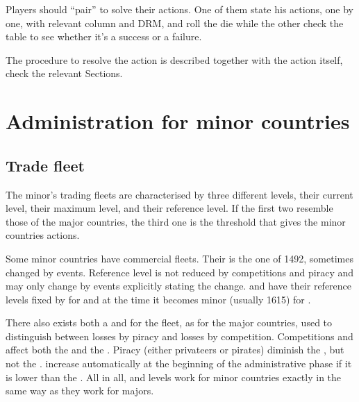 \begin{playtip}
  Players should ``pair'' to solve their actions. One of them state his
  actions, one by one, with relevant column and DRM, and roll the die while
  the other check the table to see whether it's a success or a failure.
\end{playtip}

\aparag The procedure to resolve the action is described together with the
action itself, check the relevant Sections.

\section{Administration for minor countries}

\label{chExpenses:Administration Minor}



\subsection{Trade fleet}\label{chExpenses:Minor Commercial Fleets}

\begin{note}
  The minor's trading fleets are characterised by three different levels,
  their current level, their maximum level, and their reference level. If the
  first two resemble those of the major countries, the third one is the
  threshold that gives the minor countries \TFI actions.
\end{note}

 Some minor countries have commercial
fleets. Their  is the one of 1492, sometimes changed by
events. Reference level is not reduced by competitions and piracy and may only
change by events explicitly stating the change.
\bparag[Exception] \paysPortugal and \paysVenise have their reference levels
fixed by  for \paysPortugal and at the time
it becomes minor (usually 1615) for \paysVenise.

\aparag There also exists both a  and  for the fleet, as for the major countries, used to distinguish
between losses by piracy and losses by competition.
\bparag Competitions and \TFI affect both the  and the
.
\bparag Piracy (either privateers or pirates) diminish the , but not the .
\bparag {} increase automatically at the beginning of the
administrative phase if it is lower than the .
\bparag All in all,  and  levels work for minor
countries exactly in the same way as they work for majors.

